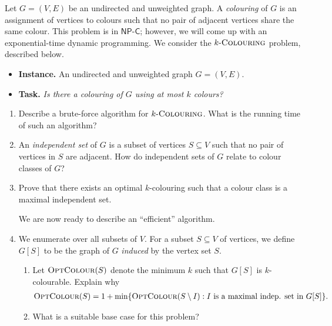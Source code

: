 \documentclass{article}
\begin{document}
\begin{question}
Let $G = (V, E)$ be an undirected and unweighted graph. A {\em colouring} of $G$ is an assignment of vertices to colours such that no pair of adjacent vertices share the same colour. This problem is in $\mathsf{NP\text{-}C}$; however, we will come up with an exponential-time dynamic programming. We consider the $k\text{-}\mathsf{\textsc{Colouring}}$ problem, described below.

\begin{itemize}
    \item[] {\bfseries Instance.} An undirected and unweighted graph $G = (V, E)$.
    \item[] {\bfseries Task.} {\em Is there a colouring of $G$ using at most $k$ colours?}
\end{itemize}

\begin{enumerate}[label = (\alph*)]
    \item Describe a brute-force algorithm for $k\text{-}\mathsf{\textsc{Colouring}}$. What is the running time of such an algorithm?

    \item An {\em independent set} of $G$ is a subset of vertices $S \subseteq V$ such that no pair of vertices in $S$ are adjacent. How do independent sets of $G$ relate to colour classes of $G$?

    \item Prove that there exists an optimal $k$-colouring such that a colour class is a maximal independent set.

    We are now ready to describe an ``efficient'' algorithm.

    \item We enumerate over all subsets of $V$. For a subset $S \subseteq V$ of vertices, we define $G[S]$ to be the graph of $G$ {\em induced} by the vertex set $S$.
    
    \begin{enumerate}[label = (\roman*)]
        \item Let $\mathsf{\textsc{OptColour}}(S)$ denote the minimum $k$ such that $G[S]$ is $k$-colourable. Explain why
        \begin{align*}
            \mathsf{\textsc{OptColour}}(S) = 1 + \min\{\mathsf{\textsc{OptColour}}(S \setminus I) : I \text{ is a maximal indep. set in } G[S]\}.
        \end{align*}

        \item What is a suitable base case for this problem?


\end{enumerate}
\end{enumerate}
\end{question}
\end{document}

